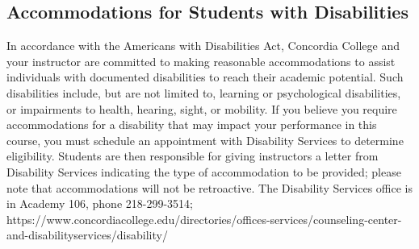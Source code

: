 \documentclass{tufte-handout}
\begin{document}
\begin{fullwidth}
%


\subsection{Accommodations for Students with Disabilities}

In accordance with the Americans with Disabilities Act, Concordia College and your instructor are committed to making reasonable accommodations to assist individuals with documented disabilities to reach their academic potential. Such disabilities include, but are not limited to, learning or psychological disabilities, or impairments to health, hearing, sight, or mobility. If you believe you require accommodations for a disability that may impact your performance in this course, you must schedule an appointment with Disability Services to determine eligibility. Students are then responsible for giving instructors a letter from Disability Services indicating the type of accommodation to be provided; please note that accommodations will not be retroactive. The Disability Services office is in Academy 106, phone 218-299-3514; https://www.concordiacollege.edu/directories/offices-services/counseling-center-and-disabilityservices/disability/ 



\end{fullwidth}
\end{document}
